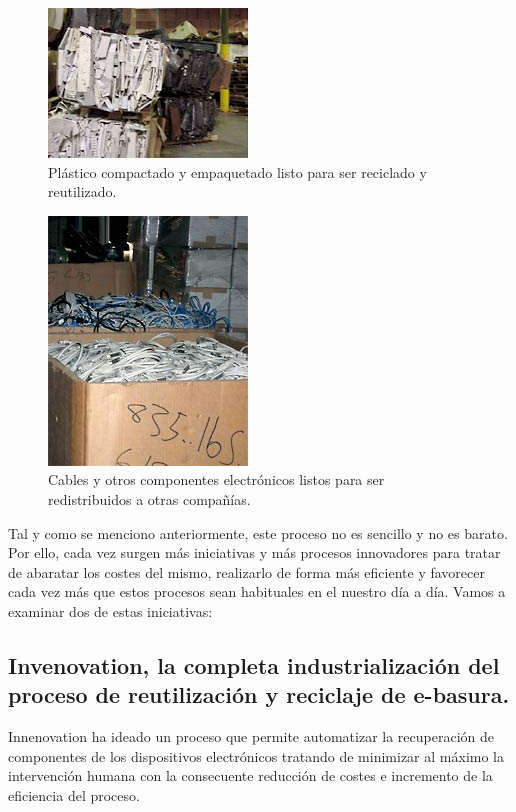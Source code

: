 \begin{figure}[H]
\begin{center}
\includegraphics[]{img/ewaste_5}
\caption{Plástico compactado y empaquetado listo para ser reciclado y reutilizado.}
\end{center}
\end{figure}

\begin{figure}[H]
\begin{center}
\includegraphics[]{img/ewaste_6}
\caption{Cables y otros componentes electrónicos listos para ser redistribuidos a otras compañías.}
\end{center}
\end{figure}

Tal y como se menciono anteriormente, este proceso no es sencillo y no es barato. Por ello, cada vez surgen más iniciativas y más procesos innovadores para tratar de abaratar los costes del mismo, realizarlo de forma más eficiente y favorecer cada vez más que estos procesos sean habituales en el nuestro día a día. Vamos a examinar dos de estas iniciativas:

\subsection{Invenovation, la completa industrialización del proceso de reutilización y reciclaje de e-basura.}

Innenovation \cite{invenovation} ha ideado un proceso que permite automatizar la recuperación de componentes de los dispositivos electrónicos tratando de minimizar al máximo la intervención humana con la consecuente reducción de costes e incremento de la eficiencia del proceso. 

